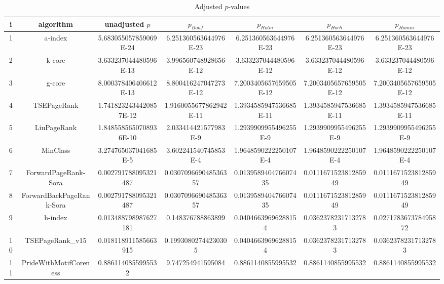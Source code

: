 \documentclass[a4paper,10pt]{article}
\begin{document}
\begin{landscape}
\begin{table}[!htp]
\centering\tiny
\caption{Adjusted $p$-values}
\begin{tabular}{ccccccc}
i&algorithm&unadjusted $p$&$p_{Bonf}$&$p_{Holm}$&$p_{Hoch}$&$p_{Homm}$\\
\hline
1&a-index&5.683055057859069E-24&6.251360563644976E-23&6.251360563644976E-23&6.251360563644976E-23&6.251360563644976E-23\\
2&k-core&3.633237044480596E-13&3.996560748928656E-12&3.633237044480596E-12&3.633237044480596E-12&3.633237044480596E-12\\
3&g-core&8.000378406406612E-13&8.800416247047273E-12&7.2003405657659505E-12&7.2003405657659505E-12&7.2003405657659505E-12\\
4&TSEPageRank&1.7418232434420857E-12&1.9160055677862942E-11&1.3934585947536685E-11&1.3934585947536685E-11&1.3934585947536685E-11\\
5&LiuPageRank&1.8485585650708936E-10&2.033414421577983E-9&1.2939909955496255E-9&1.2939909955496255E-9&1.2939909955496255E-9\\
6&MinClass&3.274765037041685E-5&3.602241540745853E-4&1.9648590222250107E-4&1.9648590222250107E-4&1.9648590222250107E-4\\
7&ForwardPageRank-Sora&0.002791788095321487&0.030709669048536357&0.013958940476607435&0.011167152381285949&0.011167152381285949\\
8&ForwardBackPageRank-Sora&0.002791788095321487&0.030709669048536357&0.013958940476607435&0.011167152381285949&0.011167152381285949\\
9&h-index&0.013488798987627181&0.148376788863899&0.04046639696288154&0.03623782317132783&0.027178367378495872\\
10&TSEPageRank_v15&0.018118911585663915&0.19930802744230305&0.04046639696288154&0.03623782317132783&0.03623782317132783\\
11&PrideWithMotifCoreness&0.8861140855995532&9.747254941595084&0.8861140855995532&0.8861140855995532&0.8861140855995532\\
\hline
\end{tabular}
\end{table}


\end{landscape}
\end{document}
